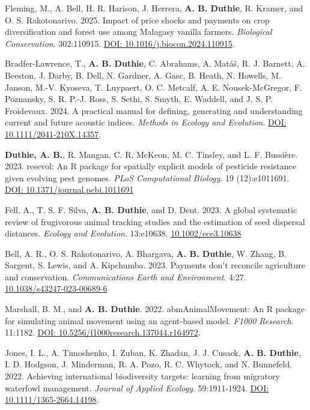 \documentclass[letterpaper]{article}
\begin{document}
\begin{etaremune}
\item Fleming, M., A. Bell, H. R. Harison, J. Herrera, {\bf A. B. Duthie}, R. Kramer, and O. S. Rakotonarivo. 2025. Impact of price shocks and payments on crop diversification and forest use among Malagasy vanilla farmers. {\it Biological Conservation}. 302:110915. \href{https://www.sciencedirect.com/science/article/pii/S0006320724004774?dgcid=coauthor}{DOI: 10.1016/j.biocon.2024.110915}.
\item Bradfer-Lawrence, T., {\bf A. B. Duthie}, C. Abrahams, A. Mat\'{a}\v{s}, R. J. Barnett, A. Beeston, J. Darby, B. Dell, N. Gardner, A. Gasc, B. Heath, N. Howells, M. Janson, M.-V. Kyoseva, T. Luypaert, O. C. Metcalf, A. E. Nousek-McGregor, F. Poznansky, S. R. P.-J. Ross, S. Sethi, S. Smyth, E. Waddell, and J. S. P. Froidevaux. 2024. A practical manual for defining, generating and understanding current and future acoustic indices. {\it Methods in Ecology and Evolution}. \href{https://besjournals.onlinelibrary.wiley.com/doi/10.1111/2041-210X.14357}{DOI: 10.1111/2041-210X.14357}.
\item {\bf Duthie, A. B.}, R. Mangan, C. R. McKeon, M. C. Tinsley, and L. F. Bussi\`{e}re. 2023. resevol: An R package for spatially explicit models of pesticide resistance given evolving pest genomes. {\it PLoS Computational Biology}. 19 (12):e1011691. \href{https://journals.plos.org/ploscompbiol/article?id=10.1371/journal.pcbi.1011691}{DOI: 10.1371/journal.pcbi.1011691}
\item Fell, A., T. S. F. Silva, {\bf A. B. Duthie}, and D. Dent. 2023. A global systematic review of frugivorous animal tracking studies and the estimation of seed dispersal distances. {\it Ecology and Evolution}. 13:e10638. \href{https://onlinelibrary.wiley.com/doi/10.1002/ece3.10638}{10.1002/ece3.10638}
\item Bell, A. R., O. S. Rakotonarivo, A. Bhargava, {\bf A. B. Duthie}, W. Zhang, B. Sargent, S. Lewis, and A. Kipchumba. 2023. Payments don't reconcile agriculture and conservation. {\it Communications Earth and Environment}. 4:27. \href{https://www.nature.com/articles/s43247-023-00689-6}{10.1038/s43247-023-00689-6}
\item Marshall, B. M., and {\bf A. B. Duthie}. 2022. abmAnimalMovement: An R package for simulating animal movement using an agent-based model. {\it F1000 Research}. 11:1182. \newline \href{https://doi.org/10.5256/f1000research.137044.r164972}{DOI: 10.5256/f1000research.137044.r164972}.
\item Jones, I. L., A. Timoshenko, I. Zuban, K. Zhadan, J. J. Cusack, {\bf A. B. Duthie}, I. D. Hodgson, J. Minderman, R. A. Pozo, R. C. Whytock, and N. Bunnefeld. 2022. Achieving international biodiversity targets: learning from migratory waterfowl management. {\it Journal of Applied Ecology}. 59:1911-1924. \href{https://besjournals.onlinelibrary.wiley.com/doi/10.1111/1365-2664.14198}{DOI: 10.1111/1365-2664.14198}.

\end{etaremune}
\end{document}
